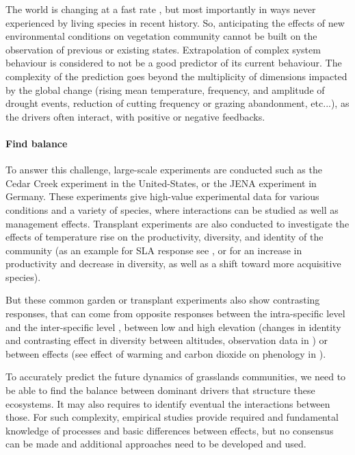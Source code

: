 The world is changing at a fast rate , but most importantly in ways never experienced by living species in recent history\parencite{butchart_global_2010, intergovernmental_panel_on_climate_change_climate_2014}. So, anticipating the effects of new environmental conditions on vegetation community cannot be built on the observation of previous or existing states. Extrapolation of complex system behaviour is considered to not be a good predictor of its current behaviour. The complexity of the prediction goes beyond the multiplicity of dimensions impacted by the global change (rising mean temperature, frequency, and amplitude of drought events, reduction of cutting frequency or grazing abandonment, etc...), as the drivers often interact, with positive or negative feedbacks. 

 \paragraph{Find balance}
 
 
 
 To answer this challenge, large-scale experiments are conducted such as the Cedar Creek experiment in the United-States, or the JENA experiment in Germany. These experiments give high-value experimental data for various conditions and a variety of species, where interactions can be studied as well as management effects. Transplant experiments are also conducted to investigate the effects of temperature rise on the productivity, diversity, and identity of the community (as an example for SLA response see \citet{scheepens_genotypic_2010}, or  \citet{debouk_functional_2015} for an increase in productivity and decrease in diversity, as well as a shift toward more acquisitive species).
 
 But these common garden or transplant experiments also show contrasting responses, that can come from opposite responses between the intra-specific level and the inter-specific level \parencite{jung_intraspecific_2014}, between low and high elevation (changes in identity and contrasting effect in diversity between altitudes, observation data in \citet{rosbakh_elevation_2014}) or between effects (see effect of warming and carbon dioxide on phenology in \citet{reyes-fox_five_2016}).
 
 To accurately predict the future dynamics of grasslands communities, we need to be able to find the balance between dominant drivers that structure these ecosystems. It may also requires to identify eventual the interactions between those. For such complexity, empirical studies provide required and fundamental knowledge of processes and basic differences between effects, but no consensus can be made \parencite{merila_climate_2014} and additional approaches need to be developed and used.
 
